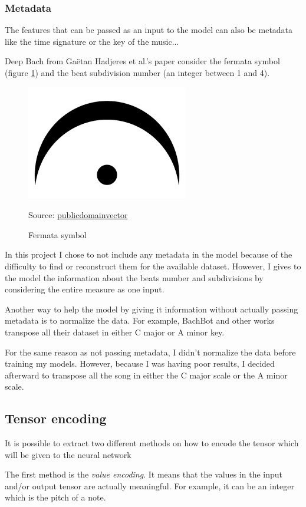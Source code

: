 \documentclass[12pt]{report}
\begin{document}
\subsubsection{Metadata}

The features that can be passed as an input to the model can also be metadata like the time signature or the key of the music...

Deep Bach from Gaëtan Hadjeres et al.'s paper \cite{hadjeres_deepbach:_2016} consider the fermata symbol (figure \ref{fig:fermata}) and the beat subdivision number (an integer between 1 and 4).

\begin{figure}[htbp]
     \centering
     \includegraphics[width=.1\linewidth]{images/music/symbols/fermata.png}
     \caption{Fermata symbol}
     Source: \href{https://publicdomainvectors.org/en/free-clipart/Music-symbol/70183.html}{publicdomainvector}
     \label{fig:fermata}
\end{figure}

In this project I chose to not include any metadata in the model because of the difficulty to find or reconstruct them for the available dataset.
However, I gives to the model the information about the beats number and subdivisions by considering the entire measure as one input.

\bigskip

Another way to help the model by giving it information without actually passing metadata is to normalize the data.
For example, BachBot \cite{liang_automatic_2017} and other works \cite{chuan_modeling_nodate, boulanger-lewandowski_modeling_2012} transpose all their dataset in either C major or A minor key.

For the same reason as not passing metadata, I didn't normalize the data before training my models.
However, because I was having poor results, I decided afterward to transpose all the song in either the C major scale or the A minor scale.

\subsection{Tensor encoding}

It is possible to extract two different methods on how to encode the tensor which will be given to the neural network

The first method is the \textit{value encoding}.
It means that the values in the input and/or output tensor are actually meaningful.
For example, it can be an integer which is the pitch of a note.
\end{document}
